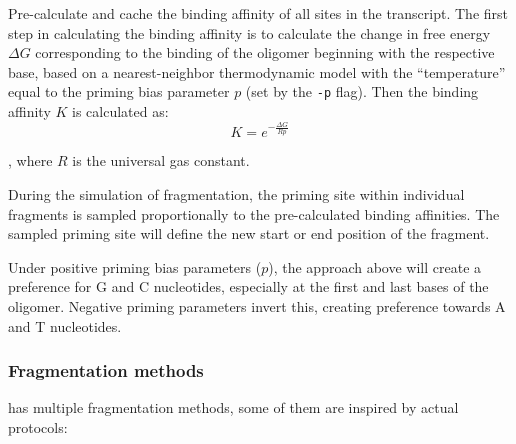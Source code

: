 \begin{itemize}
    \item{Pre-calculate and cache the binding affinity of all sites in the transcript. 
    The first step in calculating the binding affinity is to calculate the change in free energy $\Delta G$ corresponding to the binding of the oligomer beginning with the respective base, based on a nearest-neighbor thermodynamic model \cite{santalucia04} with the ``temperature'' equal to the priming bias parameter $p$ (set by the \texttt{-p} flag). Then the binding affinity $K$ is calculated as:
\begin{equation}
    K = e^{-\frac{\Delta G}{Rp}}   
\end{equation}

, where $R$ is the universal gas constant.
    \item{During the simulation of fragmentation, the priming site within individual fragments is sampled proportionally to the pre-calculated binding affinities. The sampled priming site will define the new start or end position of the fragment.}
    }


Under positive priming bias parameters ($p$), the approach above will create a preference for G and C nucleotides, especially at the first and last bases of the oligomer. Negative priming parameters invert this, creating preference towards A and T nucleotides.

\end{itemize}

\subsubsection{Fragmentation methods}
\label{sss:frag_methods}

\rlsim has multiple fragmentation methods, some of them are inspired by actual protocols:

